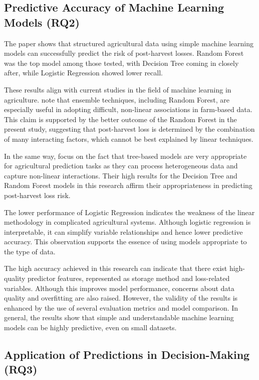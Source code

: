\subsection{Predictive Accuracy of Machine Learning Models (RQ2)}

The paper shows that structured agricultural data using simple machine learning models can
successfully predict the risk of post-harvest losses. Random Forest was the top model among those
tested, with Decision Tree coming in closely after, while Logistic Regression showed lower recall.

These results align with current studies in the field of machine learning in agriculture.
\cite{jabed2024crop} note that ensemble techniques, including Random Forest, are especially useful
in adopting difficult, non-linear associations in farm-based data. This claim is supported by the
better outcome of the Random Forest in the present study, suggesting that post-harvest loss is
determined by the combination of many interacting factors, which cannot be best explained by linear
techniques.

In the same way, \cite{meghraoui2024applied} focus on the fact that tree-based models are very
appropriate for agricultural prediction tasks as they can process heterogeneous data and capture
non-linear interactions. Their high results for the Decision Tree and Random Forest models in this
research affirm their appropriateness in predicting post-harvest loss risk.

The lower performance of Logistic Regression indicates the weakness of the linear methodology in
complicated agricultural systems. Although logistic regression is interpretable, it can simplify
variable relationships and hence lower predictive accuracy. This observation supports the essence
of using models appropriate to the type of data.

The high accuracy achieved in this research can indicate that there exist high-quality predictor
features, represented as storage method and loss-related variables. Although this improves model
performance, concerns about data quality and overfitting are also raised. However, the validity
of the results is enhanced by the use of several evaluation metrics and model comparison. In
general, the results show that simple and understandable machine learning models can be highly
predictive, even on small datasets.

\subsection{Application of Predictions in Decision-Making (RQ3)}

